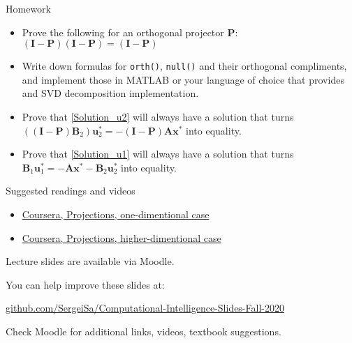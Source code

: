 \documentclass{beamer}
\begin{document}
\begin{frame}{Homework}
\begin{flushleft}

\begin{itemize}
    \item Prove the following for an orthogonal projector $\mathbf{P}$: $(\mathbf{I} - \mathbf{P})(\mathbf{I} - \mathbf{P}) = (\mathbf{I} - \mathbf{P})$
    \item Write down formulas for \texttt{orth()}, \texttt{null()} and their orthogonal compliments, and implement those in MATLAB or your language of choice that provides and SVD decomposition implementation.
    \item Prove that \eqref{Solution_u2} will always have a solution that turns $((\mathbf{I} - \mathbf{P}) \mathbf{B}_2) \mathbf{u}^*_2 = -(\mathbf{I} - \mathbf{P}) \mathbf{A} \mathbf{x}^*$ into equality.
    \item Prove that \eqref{Solution_u1} will always have a solution that turns $\mathbf{B}_1 \mathbf{u}^*_1 = -\mathbf{A} \mathbf{x}^* - \mathbf{B}_2 \mathbf{u}^*_2$ into equality.
\end{itemize}

\end{flushleft}
\end{frame}



\begin{frame}{Suggested readings and videos}
\begin{flushleft}

\begin{itemize}
    \item \href{https://www.coursera.org/learn/pca-machine-learning/lecture/2WGJu/projection-onto-1d-subspaces}{Coursera, Projections, one-dimentional case}
    \item \href{https://www.coursera.org/learn/pca-machine-learning/lecture/4Chtk/projections-onto-higher-dimensional-subspaces}{Coursera, Projections, higher-dimentional case}
\end{itemize}

\end{flushleft}
\end{frame}



\begin{frame}
\centerline{Lecture slides are available via Moodle.}
\bigskip
\centerline{You can help improve these slides at:}

\centerline{\href{https://github.com/SergeiSa/Computational-Intelligence-Slides-Fall-2020}{github.com/SergeiSa/Computational-Intelligence-Slides-Fall-2020}}


\bigskip
\centerline{Check Moodle for additional links, videos, textbook suggestions.}
\end{frame}
\end{document}

